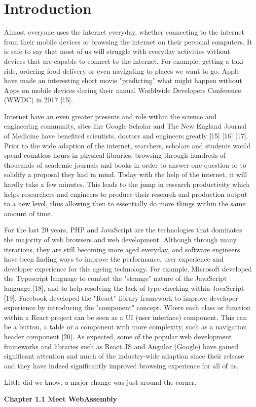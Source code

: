 \chapter{Introduction}

 Almost everyone uses the internet everyday, whether connecting to the internet from their mobile devices or browsing the internet on their personal computers. It is safe to say that most of us will struggle with everyday activities without devices that are capable to connect to the internet. For example, getting a taxi ride, ordering food delivery or even navigating to places we want to go. Apple have made an interesting short movie "predicting" what might happen without Apps on mobile devices during their annual Worldwide Developers Conference (WWDC) in 2017 [15].
 
 Internet have an even greater presents and role within the science and engineering community, sites like Google Scholar and The New England Journal of Medicine have benefited scientists, doctors and engineers greatly [15] [16] [17]. Prior to the wide adaption of the internet, searchers, scholars and students would spend countless hours in physical libraries, browsing through hundreds of thousands of academic journals and books in order to answer one question or to solidify a proposal they had in mind. Today with the help of the internet, it will hardly take a few minutes. This leads to the jump in research productivity which helps researchers and engineers to produce their research and production output to a new level, thus allowing then to essentially do more things within the same amount of time.
 
 For the last 20 years, PHP and JavaScript are the technologies that dominates the majority of web browsers and web development. Although through many iterations, they are still becoming more aged everyday, and software engineers have been finding ways to improve the performance, user experience and developer experience for this ageing technology. For example, Microsoft developed the Typescript language to combat the "strange" nature of the JavaScript language [18], and to help resolving the lack of type checking within JavaScript [19]. Facebook developed the "React" library framework to improve developer experience by introducing the "component" concept. Where each class or function within a React project can be seen as a UI (user interface) component. This can be a button, a table or a component with more complexity, such as a navigation header component [20]. As expected, some of the popular web development frameworks and libraries such as React JS and Angular (Google) have gained significant attention and much of the industry-wide adaption since their release and they have indeed significantly improved browsing experience for all of us.
 
 Little did we know, a major change was just around the corner.
 
 \bigskip
 \bigskip

\textbf{{\Large Chapter 1.1 Meet WebAssembly}}